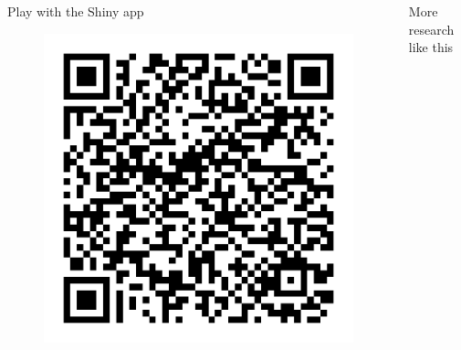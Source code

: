 \documentclass{beamer}\usepackage[]{graphicx}\usepackage[]{xcolor}
\makeatletter
\def\maxwidth{ %
  \ifdim\Gin@nat@width>\linewidth
    \linewidth
  \else
    \Gin@nat@width
  \fi
}
\newenvironment{knitrout}{}{} %
\makeatother
\begin{document}
\begin{frame}[fragile]
\begin{columns}
\begin{column}{.28\textwidth}
\begin{block}{\centering Play with the Shiny app}
\begin{figure}
\begin{knitrout}
{\centering \includegraphics[width=\maxwidth]{figure/QR-code-shiny-1} 

}


\end{knitrout}
      \end{figure}

    \end{block}
  \end{column}

  \begin{column}{.28\textwidth}
    \begin{block}{\centering More research like this}
      \begin{figure}
        \centering
\begin{knitrout}
\color{fgcolor}


\end{knitrout}
\end{figure}
\end{block}
\end{column}
\end{columns}
\end{frame}
\end{document}
